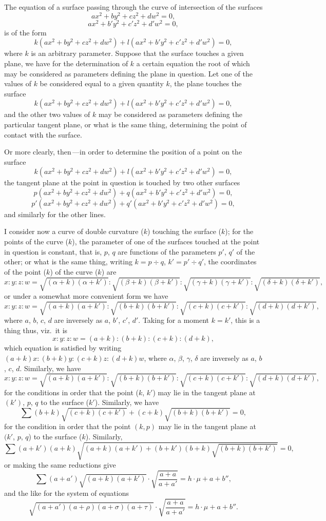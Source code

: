 \documentclass[11pt,a4paper]{article}
\theoremstyle{definition}
\begin{document}
\medskip

The equation of a surface passing through the curve of intersection of the surfaces
\[
a x^2 + b y^2 + c z^2 + d w^2 = 0,
\]
\[
a x^2 + b' y^2 + c' z^2 + d' w^2 = 0,
\]
is of the form
\[
k(a x^2 + b y^2 + c z^2 + d w^2) + l(a x^2 + b' y^2 + c' z^2 + d' w^2) = 0,
\]
where $k$ is an arbitrary parameter. Suppose that the surface touches a given plane,
we have for the determination of $k$ a certain equation the root of which may be
considered as parameters defining the plane in question. Let one of the values of $k$
be considered equal to a given quantity $k$, the plane touches the surface
\[
k(a x^2 + b y^2 + c z^2 + d w^2) + l(a x^2 + b' y^2 + c' z^2 + d' w^2) = 0,
\]
and the other two values of $k$ may be considered as parameters defining the particular
tangent plane, or what is the same thing, determining the point of contact with the
surface.

\medskip

Or more clearly, then\,---in order to determine the position of a point on the
surface
\[
k(a x^2 + b y^2 + c z^2 + d w^2) + l(a x^2 + b' y^2 + c' z^2 + d' w^2) = 0,
\]
the tangent plane at the point in question is touched by two other surfaces
\[
p(a x^2 + b y^2 + c z^2 + d w^2) + q(a x^2 + b' y^2 + c' z^2 + d' w^2) = 0,
\]
\[
p'(a x^2 + b y^2 + c z^2 + d w^2) + q'(a x^2 + b' y^2 + c' z^2 + d' w^2) = 0,
\]
and similarly for the other lines.

\medskip

I consider now a curve of double curvature ($k$) touching the surface ($k$); for the
points of the curve ($k$), the parameter of one of the surfaces touched at the point in
question is constant, that is, $p$, $q$ are functions of the parameters $p'$, $q'$ of the
other; or what is the same thing, writing $k=p\div q$, $k'=p'\div q'$, the coordinates of the point ($k$) of the curve ($k$) are
\[
x:y:z:w = \sqrt{(\alpha+k)(\alpha+k')}:\sqrt{(\beta+k)(\beta+k')}:\sqrt{(\gamma+k)(\gamma+k')}:\sqrt{(\delta+k)(\delta+k')},
\]
or under a somewhat more convenient form we have
\[
x:y:z:w = \sqrt{(a+k)(a+k')}:\sqrt{(b+k)(b+k')}:\sqrt{(c+k)(c+k')}:\sqrt{(d+k)(d+k')},
\]
where $a$, $b$, $c$, $d$ are inversely as $a$, $b'$, $c'$, $d'$. Taking for a moment $k=k'$, this is a thing thus, viz.\ it is
\[
x:y:z:w = (a+k):(b+k):(c+k):(d+k),
\]
which equation is satisfied by writing $(a+k)x : (b+k)y : (c+k)z : (d+k)w$, where $\alpha$, $\beta$, $\gamma$, $\delta$ are inversely as $a$, $b$, $c$, $d$. Similarly, we have
\[
x:y:z:w = \sqrt{(a+k)(a+k')}:\sqrt{(b+k)(b+k')}:\sqrt{(c+k)(c+k')}:\sqrt{(d+k)(d+k')},
\]
for the conditions in order that the point ($k$, $k'$) may lie in the tangent plane at
$(k')$, $p$, $q$ to the surface ($k'$). Similarly, we have
\[
\sum (b+k)\sqrt{(c+k)(c+k')}+(c+k)\sqrt{(b+k)(b+k')} = 0,
\]
for the condition in order that the point $(k, p)$ may lie in the tangent plane at
$(k'$, $p$, $q$) to the surface ($k$). Similarly,
\[
\sum (a+k')(a+k)\sqrt{(a+k)(a+k')+(b+k')(b+k)\sqrt{(b+k)(b+k')}} = 0,
\]
or making the same reductions give
\[
\sum (a+a')\sqrt{(a+k)(a+k')}\cdot\sqrt{\frac{a+a}{a+a'}} = h \cdot \mu + a + b'',
\]
and the like for the system of equations
\[
\sqrt{(a+a')(a+\rho)(a+\sigma)(a+\tau)} \cdot \sqrt{\frac{a+a}{a+a'}} = h \cdot \mu + a + b''.
\]
\end{document}

